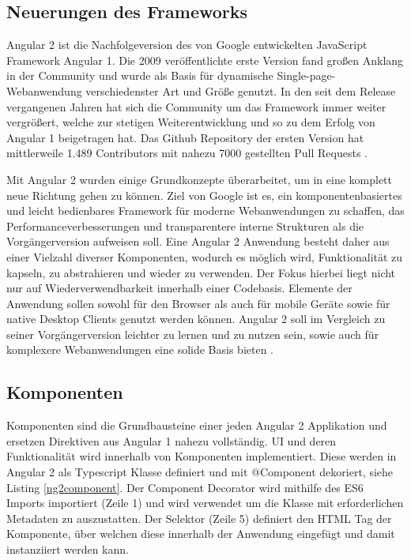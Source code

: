 \subsection{Neuerungen des Frameworks}

Angular 2 ist die Nachfolgeversion des von Google entwickelten JavaScript Framework Angular 1.
Die 2009 veröffentlichte erste Version fand großen Anklang in der Community
und wurde als Basis für dynamische Single-page-Webanwendung verschiedenster Art und Größe genutzt.
In den seit dem Release vergangenen Jahren hat sich die Community um das Framework immer weiter vergrößert,
welche zur stetigen Weiterentwicklung und so zu dem Erfolg von Angular 1 beigetragen hat.
Das Github Repository der ersten Version hat mittlerweile 1.489 Contributors mit nahezu 7000 gestellten Pull Requests \cite{ng1-github}.

Mit Angular 2 wurden einige Grundkonzepte überarbeitet, um in eine komplett neue Richtung gehen zu können.
Ziel von Google ist es, ein komponentenbasiertes und leicht bedienbares Framework für moderne
Webanwendungen zu schaffen, das Performanceverbesserungen und transparentere interne Strukturen als die Vorgängerversion aufweisen soll.
Eine Angular 2 Anwendung besteht daher aus einer Vielzahl diverser Komponenten, wodurch es möglich wird,
Funktionalität zu kapseln, zu abstrahieren und wieder zu verwenden. Der Fokus hierbei liegt nicht nur auf Wiederverwendbarkeit innerhalb einer Codebasis.
Elemente der Anwendung sollen sowohl für den Browser als auch für mobile Geräte sowie für native Desktop Clients genutzt werden können.
Angular 2 soll im Vergleich zu seiner Vorgängerversion leichter zu lernen und zu nutzen sein,
sowie auch für komplexere Webanwendungen eine solide Basis bieten \cite[11-12]{Angular2}.


\subsection{Komponenten}

Komponenten sind die Grundbausteine einer jeden Angular 2 Applikation und ersetzen Direktiven aus Angular 1 nahezu vollständig.
UI und deren Funktionalität wird innerhalb von Komponenten implementiert.
Diese werden in Angular 2 als Typescript Klasse definiert und mit @Component dekoriert, siehe Listing \ref{ng2component}.
Der Component Decorator wird mithilfe des ES6 Imports importiert (Zeile 1) und wird verwendet um die Klasse mit erforderlichen Metadaten zu auszustatten.
Der Selektor (Zeile 5) definiert den HTML Tag der Komponente, über welchen diese innerhalb der Anwendung eingefügt und damit instanziiert werden kann.

